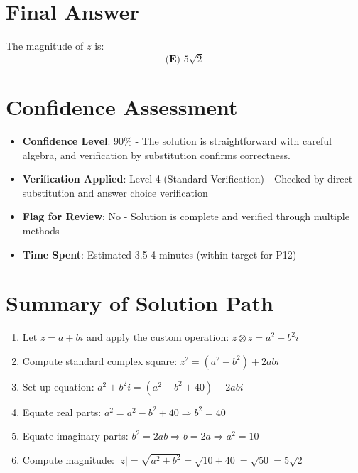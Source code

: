 \documentclass[12pt]{article}
\begin{document}
\section*{Final Answer}

The magnitude of $z$ is:
$$\boxed{\textbf{(E) } 5\sqrt{2}}$$

\section*{Confidence Assessment}
\begin{itemize}[leftmargin=*]
    \item \textbf{Confidence Level}: 90\% - The solution is straightforward with careful algebra, and verification by substitution confirms correctness.
    \item \textbf{Verification Applied}: Level 4 (Standard Verification) - Checked by direct substitution and answer choice verification
    \item \textbf{Flag for Review}: No - Solution is complete and verified through multiple methods
    \item \textbf{Time Spent}: Estimated 3.5-4 minutes (within target for P12)
\end{itemize}

\section*{Summary of Solution Path}

\begin{enumerate}
    \item Let $z = a + bi$ and apply the custom operation: $z \otimes z = a^2 + b^2i$
    \item Compute standard complex square: $z^2 = (a^2-b^2) + 2abi$
    \item Set up equation: $a^2 + b^2i = (a^2-b^2+40) + 2abi$
    \item Equate real parts: $a^2 = a^2 - b^2 + 40 \Rightarrow b^2 = 40$
    \item Equate imaginary parts: $b^2 = 2ab \Rightarrow b = 2a \Rightarrow a^2 = 10$
    \item Compute magnitude: $|z| = \sqrt{a^2+b^2} = \sqrt{10+40} = \sqrt{50} = 5\sqrt{2}$
\end{enumerate}
\end{document}
